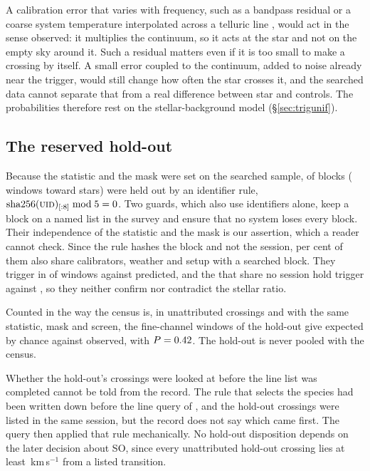 A calibration error that varies with frequency, such as a bandpass residual
or a coarse system temperature interpolated across a telluric line
\citep{ALMATsys2018}, would act in the sense observed: it multiplies the
continuum, so it acts at the star and not on the empty sky around it. Such
a residual matters even if it is too small to make a crossing by itself. A small
error coupled to the continuum, added to noise already near the trigger,
would still change how often the star crosses it, and the searched data
cannot separate that from a real difference between star and controls. The
probabilities therefore rest on the stellar-background model
(\S\ref{sec:trigunif}).

\subsection{The reserved hold-out}
\label{sec:heldout}

Because the statistic and the mask were set on the searched sample,
\NEbHeldOut{} of \NEbProcessedAll{} blocks (\HoWin{} windows toward
\HoStars{} stars) were held out by an identifier rule,
$\mathrm{sha256}(\textsc{uid})_{[:8]} \bmod 5 = 0$. Two guards, which also
use identifiers alone, keep a block on a named list in the survey and ensure
that no system loses every block. Their independence of the statistic and the mask
is our assertion, which a reader cannot check. Since the rule hashes the
block and not the session, \HsSharePct{} per cent of them also share
calibrators, weather and setup with a searched block. They trigger in \StHoObs{} of
\StHoNFine{} windows against \StHoExpFine{} predicted, and the
\HsIndBlocks{} that share no session hold \HsIndObsWord{} trigger
\HsIndObsNoun{} against \HsIndExp, so they neither confirm nor contradict
the stellar ratio.

Counted in the way the census is, in unattributed crossings and with the
same statistic, mask and screen, the \CgHoNWin{} fine-channel windows of the
hold-out give \CgHoExp{} expected by chance against \CgHoObs{} observed, with
$P=0.42$. The hold-out is never pooled with the census.

Whether the hold-out's crossings were looked at before the line list was
completed cannot be told from the record. The rule that selects the species
had been written down before the line query of \MkListDate, and the hold-out
crossings were listed in the same session, but the record does not say which
came first. The query then applied that rule mechanically. No hold-out
disposition depends on the later decision about SO, since every
unattributed hold-out crossing lies at least \CgHoMinDv\,km\,s$^{-1}$ from
a listed transition.


